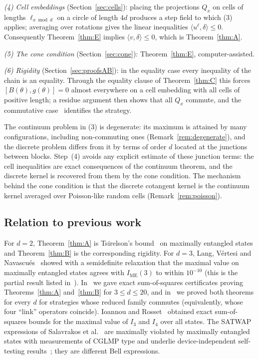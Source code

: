 \documentclass[11pt]{amsart}
\theoremstyle{definition}
\theoremstyle{remark}
\numberwithin{equation}{section}
\newcommand{\IME}{I_{\mathrm{ME}}}
\newcommand{\ip}[2]{\langle #1,#2\rangle}
\begin{document}
\emph{(4) Cell embeddings} (Section~\ref{sec:cells}): placing the projections $Q_x$ on cells of lengths
$\ell_{x\bmod d}$ on a circle of length $4d$ produces a step field to which (3) applies; averaging over rotations
gives the linear inequalities $\ip{u^\ell}\delta\le0$. Consequently Theorem~\ref{thm:E} implies $\ip v\delta\le0$,
which is Theorem~\ref{thm:A}.

\emph{(5) The cone condition} (Section~\ref{sec:cone}): Theorem~\ref{thm:E}, computer-assisted.

\emph{(6) Rigidity} (Section~\ref{sec:proofsAB}): in the equality case every inequality of the chain is an equality.
Through the equality clause of Theorem~\ref{thm:C} this forces $[B(\theta),g(\theta)]=0$ almost everywhere on a cell
embedding with all cells of positive length; a residue argument then shows that all $Q_x$ commute, and the
commutative case~\cite{MS-classical} identifies the strategy.

The continuum problem in (3) is degenerate: its maximum is attained by many configurations, including non-commuting
ones (Remark~\ref{rem:degenerate}), and the discrete problem differs from it by terms of order $d$ located at the
junctions between blocks. Step~(4) avoids any explicit estimate of these junction terms: the cell inequalities are
exact consequences of the continuum theorem, and the discrete kernel is recovered from them by the cone condition.
The mechanism behind the cone condition is that the discrete cotangent kernel is the continuum kernel averaged over
Poisson-like random cells (Remark~\ref{rem:poisson}).

\subsection{Relation to previous work}\label{subsec:previous}
For $d=2$, Theorem~\ref{thm:A} is Tsirelson's bound~\cite{Tsirelson} on maximally entangled states and
Theorem~\ref{thm:B} is the corresponding rigidity. For $d=3$, Lang, V\'ertesi and Navascu\'es~\cite{LVN} showed
with a semidefinite relaxation that the maximal value on maximally entangled states agrees with $\IME(3)$ to within
$10^{-10}$ (this is the partial result listed in~\cite{OQP}). In~\cite{repo-cglmp} we gave exact sum-of-squares
certificates proving Theorems~\ref{thm:A} and~\ref{thm:B} for $3\le d\le20$, and in~\cite{MS-classical} we proved
both theorems for every $d$ for strategies whose reduced family commutes (equivalently, whose four ``link''
operators coincide). Ioannou and Rosset~\cite{IR} obtained exact sum-of-squares bounds for the maximal value of $I_3$
and $I_4$ over all states. The SATWAP expressions of Salavrakos et al.~\cite{SATWAP} are maximally violated by
maximally entangled states with measurements of CGLMP type and underlie device-independent self-testing
results~\cite{SSKA}; they are different Bell expressions.
\end{document}
